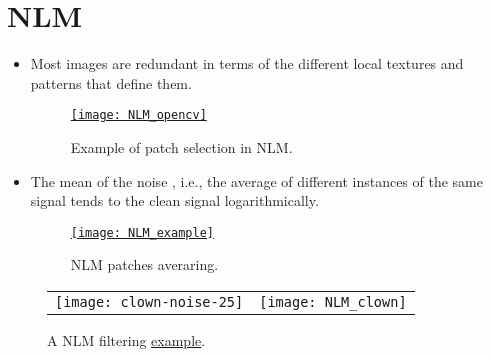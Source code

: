 \section{\gls{NLM} \cite{buades2010image}}
\begin{itemize}
\item Most images are redundant in terms of the different local
  textures and patterns that define them.
  \begin{figure}[H]
    \vspace{2ex}
    \centering
    \href{https://docs.opencv.org/3.4/d5/d69/tutorial_py_non_local_means.html}{\texttt{[image: NLM\_opencv]}}
    \caption{Example of patch selection in \gls{NLM}.}
    \label{fig:NLM_patching}
  \end{figure}
\end{itemize}
  
\begin{itemize}
\item The mean of the noise , i.e.,
  the average of different instances of the same signal tends to the
  clean signal logarithmically.
  \begin{figure}[H]
    \vspace{0ex}
    \centering
    \href{https://www.umbjournal.org/article/S0301-5629(17)30201-6/fulltext}{\texttt{[image: NLM\_example]}}
    \caption{\gls{NLM} patches averaring.}
    \label{fig:NLM_averaging}
  \end{figure}
\end{itemize}

\begin{figure}[H]
  \vspace{0ex}
  \centering
  \begin{tabular}{cc}
    \texttt{[image: clown-noise-25]} & \texttt{[image: NLM\_clown]}
  \end{tabular}
  \caption{A \gls{NLM} filtering \href{https://imagej.net/plugins/non-local-means-denoise/}{example}.}
  \label{fig:NLM_example}
\end{figure}

